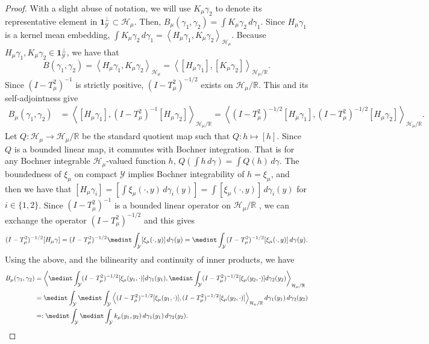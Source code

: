 \documentclass{article}
\theoremstyle{plain}
\theoremstyle{definition}
\theoremstyle{remark}
\newcommand{\R}{\mathbb{R}}
\newcommand{\cH}{\mathcal{H}}
\newcommand{\cY}{\mathcal{Y}}
\newcommand{\1}{\mathbbm{1}}
\newcommand{\iprod}[1]{\left\langle #1 \right\rangle}
\theoremstyle{plain}
\theoremstyle{definition}
\begin{document}
\begin{proof}
    With a slight abuse of notation, we will use $K_\mu \gamma_2$ to denote its representative element in $\mathbf{1}_\cY^\perp \subset \cH_\mu$. Then, $B_\mu(\gamma_1, \gamma_2) = \int K_\mu \gamma_2 \, d\gamma_1$. Since $H_\mu \gamma_1$ is a kernel mean embedding, $\int K_\mu \gamma_2 \, d\gamma_1 = \iprod{H_\mu \gamma_1, K_\mu \gamma_2}_{\cH_\mu}$. Because $H_\mu \gamma_1, K_\mu \gamma_2 \in \mathbf{1}_\cY^\perp$, we have that
    \[
    B(\gamma_1, \gamma_2) = \iprod{H_\mu \gamma_1, K_\mu\gamma_2}_{\cH_\mu} = \iprod{[H_\mu \gamma_1], [K_\mu \gamma_2]}_{\cH_\mu / \R}.
    \]
    Since $(I - T_\mu^2)^{-1}$ is strictly positive, $(I - T_\mu^2)^{-1/2}$ exists on $\cH_\mu / \R$. This and its self-adjointness \citep[Prop.~4.2]{lavenant2024riemannian} give
    \begin{align*}
        B_\mu(\gamma_1, \gamma_2) &= \iprod{[H_\mu \gamma_1], (I - T_\mu^2)^{-1} [H_\mu \gamma_2]}_{\cH_\mu / \R} =  \iprod{(I - T_\mu^2)^{-1/2} [H_\mu \gamma_1], (I - T_\mu^2)^{-1/2}[H_\mu \gamma_2]}_{\cH_\mu / \R}.
    \end{align*}
    Let $Q: \cH_\mu \to \cH_\mu/\R$ be the standard quotient map such that $Q: h \mapsto [h]$. Since $Q$ is a bounded linear map, it commutes with Bochner integration. That is for any Bochner integrable $\cH_\mu$-valued function $h$, $Q(\int h \, d\gamma) = \int Q(h) \, d\gamma$. The boundedness of $\xi_\mu$ on compact $\cY$ implies Bochner integrability of $h = \xi_\mu$, and then we have that $[H_\mu \gamma_i] = [\int \xi_\mu(\cdot, y) \, d\gamma_i(y)] = \int [\xi_\mu(\cdot, y)] \, d\gamma_i(y)$ for $i\in \{1,2\}$. Since $(I - T_\mu^2)^{-1}$ is a bounded linear operator on $\cH_\mu / \R$ \citep[Thm.~4.3]{lavenant2024riemannian}, we can exchange the operator $(I - T_\mu^2)^{-1/2}$ and this gives
    \[
    (I - T_\mu^2)^{-1/2} [H_\mu \gamma] = (I - T_\mu^2)^{-1/2} \medint\int_\cY [\xi_\mu(\cdot, y)]\, d\gamma(y) = \medint\int_\cY (I - T_\mu^2)^{-1/2} [\xi_\mu(\cdot, y)]\, d\gamma(y).
    \]
    Using the above, and the bilinearity and continuity of inner products, we have
    \begin{align*}
        B_\mu(\gamma_1, \gamma_2) &=  \iprod{\medint\int_\cY (I - T_\mu^2)^{-1/2} [\xi_\mu(y_1, \cdot)] d\gamma_1(y_1), \medint\int_\cY (I - T_\mu^2)^{-1/2} [\xi_\mu(y_2, \cdot)] d\gamma_2(y_2)}_{\cH_\mu / \R}\\
        &= \medint\int_\cY \medint\int_\cY \iprod{(I - T_\mu^2)^{-1/2} [\xi_\mu(y_1, \cdot)] , (I - T_\mu^2)^{-1/2} [\xi_\mu(y_2, \cdot)] }_{\cH_\mu / \R} d\gamma_1(y_1) \, d\gamma_2(y_2)\\
        &=: \medint\int_\cY \medint\int_\cY k_\mu(y_1, y_2)\, d\gamma_1(y_1) \, d\gamma_2(y_2).
    \end{align*}


\end{proof}
\end{document}
